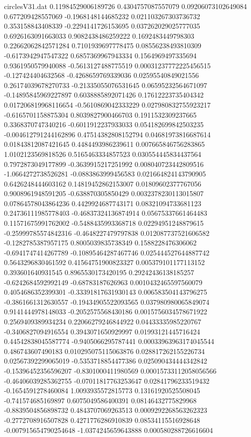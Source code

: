 \begin{filecontents}{circlesV31.dat}
0.11984529006189726	0.4304757087557079	0.09206073102649084
0.677209428557069	-0.1968148144685232	0.021103267303736732
0.353158843408339	-0.2294141726153695	0.037262029025777035
0.6926163091663033	0.9082438486259222	0.1692483449798303
0.22662062842571284	0.7101939697778475	0.08556238493810309
-0.6173942947547322	0.6857369967943334	0.1564969497335694
0.9361950579940088	-0.5613127488775519	0.00031237772225456515
-0.127424404632568	-0.4268659769339036	0.02595540849021556
0.26174039678270733	-0.21335055076531645	0.06595232564671097
-0.14895845969227897	0.6038885892071426	0.17612223735404342
0.017206819968116654	-0.5610869042333229	0.027980832755923217
-0.6165701158875304	0.8039827900466703	0.1911532309237665
0.3368370747340216	-0.6011912237933033	0.054182699842503235
-0.004612791244162896	0.47514382808152794	0.04681973816687614
0.01843812087421645	0.4484493986239611	0.007665846756283865
1.0102123569818526	0.5165463334857523	0.030554445834437564
0.7972873049177899	-0.3639915217251992	0.008040723442809516
-1.0664272738526281	-0.0883863999456583	0.021664824143790905
0.6426248444603162	0.14819452862153007	0.01809602377767056
0.9008961948591205	-0.638870305850429	0.0032378230113015807
0.07864578043864236	0.4429924687743171	0.08321094733681123
0.24736111985778403	-0.46837324136874914	0.05675337661464483
0.11571675991762002	-0.5488435993368718	0.02294951248879615
-0.25999785574842316	-0.4648227479797838	0.012087737521606582
-0.1282785387957175	0.8005039835738349	0.1588228476306062
-0.6941747414267789	-0.10895464287467746	0.025444527644887742
0.5643296830461592	0.41564751900823327	0.005379101177113152
0.393601640931545	0.8965530173420195	0.29242436138185257
-0.6242684592992149	-0.68783187626963	0.0010432465597560079
0.4054686352399301	-0.33391817631930143	0.006583504143796275
-0.3861661312630557	-0.19434905522093565	0.037980980065849074
0.9141444978148033	-0.2052575568430186	0.0015756034578671922
0.2569409389934234	0.22066279246844922	0.04433335985220767
-0.3406827094916554	0.3943071650929997	0.01993121445716424
0.44542838045587774	-0.9405066295787441	0.00033963963174045544
0.486743607490183	0.010295075115063876	0.028817262155226734
0.02567392299065019	-0.5353718854477386	0.025090434444342842
-0.15396452356596207	-0.8301000411980569	0.00015733112058056566
-0.46406039285362755	-0.07011817763253647	0.02841796233519432
-0.1654591278460084	1.0093935572815773	0.13161920525508045
-0.741574685169897	0.6075049586400391	0.08146432775829968
-0.8839504856898732	0.4843707069263513	0.0009292268563262323
-0.2772708916507828	0.4271776286910839	0.08534115516928648
-0.007915654790254648	-1.0374245659643888	0.000580288726616604

\end{filecontents}
